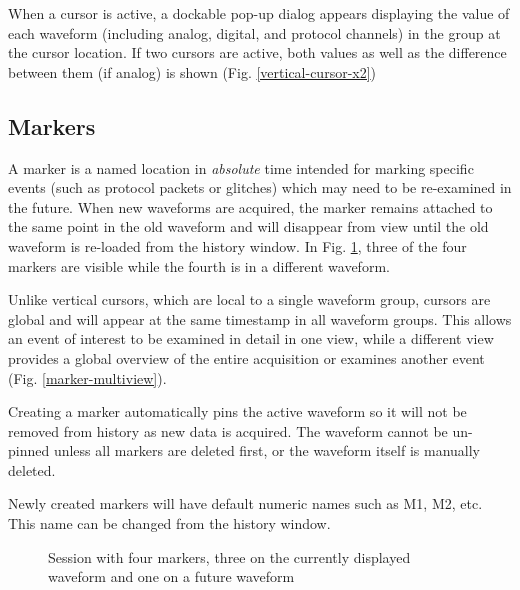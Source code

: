 When a cursor is active, a dockable pop-up dialog appears displaying the value of each waveform (including analog,
digital, and protocol channels) in the group at the cursor location. If two cursors are active, both values as well as
the difference between them (if analog) is shown (Fig. \ref{vertical-cursor-x2})

\subsection{Markers}
\label{sec:markers}

A marker is a named location in \emph{absolute} time intended for marking specific events (such as protocol packets or
glitches) which may need to be re-examined in the future. When new waveforms are acquired, the marker remains attached
to the same point in the old waveform and will disappear from view until the old waveform is re-loaded from the history
window. In Fig. \ref{markers}, three of the four markers are visible while the fourth is in a different waveform.

Unlike vertical cursors, which are local to a single waveform group, cursors are global and will appear at the same
timestamp in all waveform groups. This allows an event of interest to be examined in detail in one view, while a
different view provides a global overview of the entire acquisition or examines another event (Fig.
\ref{marker-multiview}).

Creating a marker automatically pins the active waveform so it will not be removed from history as new data is
acquired. The waveform cannot be un-pinned unless all markers are deleted first, or the waveform itself is manually
deleted.

Newly created markers will have default numeric names such as M1, M2, etc. This name can be changed from the history
window.

\begin{figure}[H]
\centering
{}
\caption{Session with four markers, three on the currently displayed waveform and one on a future waveform}
\label{markers}
\end{figure}

